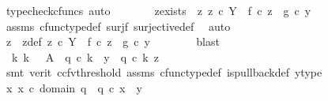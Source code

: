 \begin{isabellebody}
\ {\isacharparenleft}{\kern0pt}typecheck{\isacharunderscore}{\kern0pt}cfuncs{\isacharcomma}{\kern0pt}\ auto{\isacharparenright}{\kern0pt}\isanewline
\ \ \ \ \isamarkupfalse%
\ \isamarkupfalse%
\ z{\isacharunderscore}{\kern0pt}exists{\isacharcolon}{\kern0pt}\ {\isachardoublequoteopen}{\isasymexists}\ z{\isachardot}{\kern0pt}\ z\ {\isasymin}\isactrlsub c\ Y\ {\isasymand}\ f\ {\isasymcirc}\isactrlsub c\ z\ {\isacharequal}{\kern0pt}\ g\ {\isasymcirc}\isactrlsub c\ y{\isachardoublequoteclose}\isanewline
\ \ \ \ \ \ \isamarkupfalse%
\ assms{\isacharparenleft}{\kern0pt}{}{\isacharparenright}{\kern0pt}\ cfunc{\isacharunderscore}{\kern0pt}type{\isacharunderscore}{\kern0pt}def\ surj{\isacharunderscore}{\kern0pt}f\ surjective{\isacharunderscore}{\kern0pt}def\ \isamarkupfalse%
\ auto\isanewline
\ \ \ \ \isamarkupfalse%
\ \isamarkupfalse%
\ z\ \ z{\isacharunderscore}{\kern0pt}def{\isacharcolon}{\kern0pt}\ {\isachardoublequoteopen}z\ {\isasymin}\isactrlsub c\ Y\ {\isasymand}\ f\ {\isasymcirc}\isactrlsub c\ z\ {\isacharequal}{\kern0pt}\ g\ {\isasymcirc}\isactrlsub c\ y{\isachardoublequoteclose}\isanewline
\ \ \ \ \ \ \isamarkupfalse%
\ blast\isanewline
\ \ \ \ \isamarkupfalse%
\ \isamarkupfalse%
\ {\isachardoublequoteopen}{\isasymexists}{\isacharbang}{\kern0pt}\ k{\isachardot}{\kern0pt}\ k{\isacharcolon}{\kern0pt}\ {\isasymone}\ {\isasymrightarrow}\ A\ {\isasymand}\ q{}\ {\isasymcirc}\isactrlsub c\ k\ {\isacharequal}{\kern0pt}\ y\ {\isasymand}\ q{}\ {\isasymcirc}\isactrlsub c\ k\ {\isacharequal}{\kern0pt}z{\isachardoublequoteclose}\isanewline
\ \ \ \ \ \ \isamarkupfalse%
\ {\isacharparenleft}{\kern0pt}smt\ {\isacharparenleft}{\kern0pt}verit{\isacharcomma}{\kern0pt}\ ccfv{\isacharunderscore}{\kern0pt}threshold{\isacharparenright}{\kern0pt}\ assms{\isacharparenleft}{\kern0pt}{}{\isacharparenright}{\kern0pt}\ cfunc{\isacharunderscore}{\kern0pt}type{\isacharunderscore}{\kern0pt}def\ is{\isacharunderscore}{\kern0pt}pullback{\isacharunderscore}{\kern0pt}def\ y{\isacharunderscore}{\kern0pt}type{\isacharparenright}{\kern0pt}\isanewline
\ \ \ \ \isamarkupfalse%
\ \isamarkupfalse%
\ {\isachardoublequoteopen}{\isasymexists}x{\isachardot}{\kern0pt}\ x\ {\isasymin}\isactrlsub c\ domain\ q{}\ {\isasymand}\ q{}\ {\isasymcirc}\isactrlsub c\ x\ {\isacharequal}{\kern0pt}\ y{\isachardoublequoteclose}\isanewline

\end{isabellebody}
